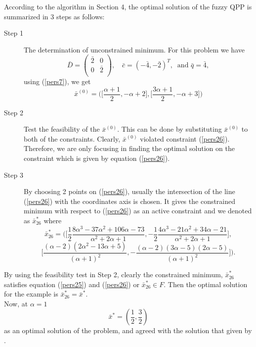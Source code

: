 \documentclass{iaesarticle3}
\begin{document}
According to the algorithm in Section 4, the optimal solution of the fuzzy QPP is summarized in 3 steps as follows:
\begin{description}
  \item[Step 1] The determination of unconstrained minimum. For this problem we have
      \begin{equation}
        \bar{D} = \left(
          \begin{array}{cc}
            \bar{2} & 0 \\
            0 & \bar{2} \\
          \end{array}
        \right), \quad \bar{c} = (-\bar{4}, -\bar{2})^T,~ \mbox{ and } \bar{q} = \bar{4},
      \end{equation}
       using (\ref{pers7}), we get $$\bar{x}^{(0)} = \bigg( \Big[\frac{\alpha +1}{2}, -\alpha + 2\Big], \Big[\frac{3\alpha +1}{2}, -\alpha +3\Big]\bigg)$$
  \item[Step 2] Test the feasibility of the $\bar{x}^{(0)}$. This can be done by substituting $\bar{x}^{(0)}$  to both of the constraints. Clearly, $\bar{x}^{(0)}$ violated constraint (\ref{pers26}). Therefore, we  are only focusing in finding the optimal solution on the constraint which is given by  equation (\ref{pers26}).
  \item[Step 3] By choosing 2 points on (\ref{pers26}), usually the intersection of the line (\ref{pers26}) with the coordinates axis is chosen. It gives the constrained minimum with respect to (\ref{pers26}) as an active constraint and we denoted as $\bar{x}^*_{26}$ where
      $$ \bar{x}_{26}^* = \bigg( \Big[\frac{1}{2}\frac{8\alpha^3 - 37\alpha^2 + 106\alpha - 73}{\alpha^2 + 2\alpha + 1}, -\frac{1}{2}\frac{4\alpha^3 - 21\alpha^2 +34\alpha - 21}{\alpha^2 + 2\alpha + 1}\Big],$$
       $$\Big[ \frac{(\alpha - 2)(2\alpha^2 - 13\alpha + 5)}{(\alpha + 1)^2}, -\frac{(\alpha - 2)(3\alpha - 5)(2\alpha - 5)}{(\alpha + 1)^2}\Big] \bigg).$$
\end{description}
By using the feasibility test in Step 2, clearly the constrained minimum, $\bar{x}_{26}^*$ satisfies equation (\ref{pers25}) and (\ref{pers26}) or $\bar{x}_{26}^* \in F$. Then the optimal solution for the example is $\bar{x}_{26}^* = \bar{x}^*$.\\
Now, at $ \alpha = 1$
$$\bar{x}^* = (\frac{1}{2}, \frac{3}{2})$$
as an optimal solution of the problem, and agreed with the solution that given by \cite{dav}.
\end{document}
